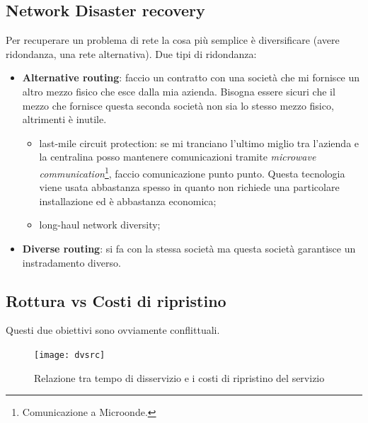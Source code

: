 \subsection{Network Disaster recovery}

Per recuperare un problema di rete la cosa più semplice è diversificare (avere
ridondanza, una rete alternativa). Due tipi di ridondanza:
\begin{itemize}
  \item \textbf{Alternative routing}: faccio un contratto con una società che
  mi fornisce un altro mezzo fisico che esce dalla mia azienda. Bisogna essere
sicuri che il mezzo che fornisce questa seconda società non sia lo stesso mezzo
fisico, altrimenti è inutile.
  \begin{itemize}
    \item last-mile circuit protection: se mi tranciano l'ultimo miglio tra
l'azienda e la centralina posso mantenere comunicazioni tramite
\textit{microwave communication}\footnote{Comunicazione a Microonde.}, faccio
comunicazione punto punto. Questa tecnologia viene usata abbastanza spesso in
quanto non richiede una particolare installazione ed è abbastanza economica;
    \item long-haul network diversity;
  \end{itemize}
  \item \textbf{Diverse routing}: si fa con la stessa società ma questa società
garantisce un instradamento diverso.
\end{itemize}

\subsection{Rottura vs Costi di ripristino}

Questi due obiettivi sono ovviamente conflittuali.

\begin{figure}[H]
  \centering
  \texttt{[image: dvsrc]}
  \caption{Relazione tra tempo di disservizio e i costi di ripristino del
  servizio}
\end{figure}

